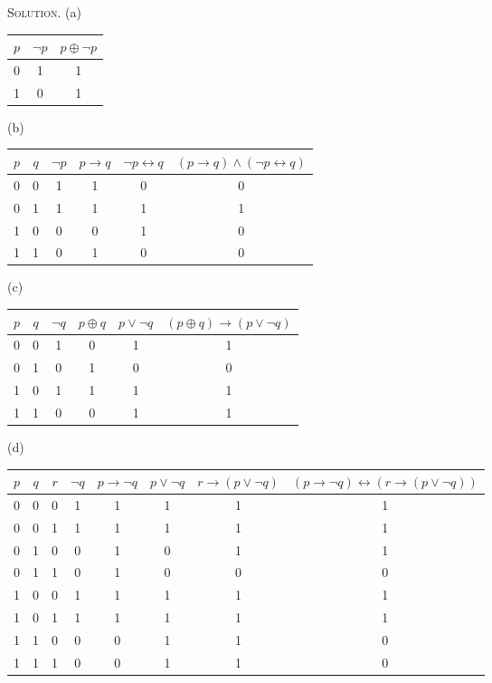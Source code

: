 \documentclass[12pt, a4paper, oneside]{article}
\newenvironment{solution}{\par\noindent\textsc{Solution. }}{\\\par}
\begin{document}
\begin{solution}
\newline(a)
\begin{table}[!htbp]
\begin{tabular}{|c|c|c|}
\hline
$p$ & $\neg p$ & $p\oplus \neg p$ \\ \hline
0 & 1 & 1 \\ \hline
1 & 0 & 1 \\
\hline
\end{tabular}
\end{table}
\newpage\noindent(b)
\begin{table}[!htbp]
\begin{tabular}{|c|c|c|c|c|c|}
\hline
$p$ & $q$ & $\neg p$ & $p \rightarrow q$ & $\neg p \leftrightarrow q$ & $\left( p \rightarrow q \right) \wedge \left( \neg p \leftrightarrow q \right)$\\ \hline
0 & 0 & 1 & 1 & 0 & 0 \\ \hline
0 & 1 & 1 & 1 & 1 & 1 \\ \hline
1 & 0 & 0 & 0 & 1 & 0 \\ \hline
1 & 1 & 0 & 1 & 0 & 0 \\
\hline
\end{tabular}
\end{table}
\newline(c)
\begin{table}[!htbp]
\begin{tabular}{|c|c|c|c|c|c|}
\hline
$p$ & $q$ & $\neg q$ & $p \oplus q$ & $p \vee \neg q$ & $\left( p \oplus q \right) \rightarrow \left( p \vee \neg q \right)$ \\ 
\hline
0 & 0 & 1 & 0 & 1 & 1 \\ \hline
0 & 1 & 0 & 1 & 0 & 0 \\ \hline
1 & 0 & 1 & 1 & 1 & 1 \\ \hline
1 & 1 & 0 & 0 & 1 & 1 \\
\hline
\end{tabular}
\end{table}
\newline(d)
\begin{table}[!htbp]
\begin{tabular}{|c|c|c|c|c|c|c|c|}
\hline
$p$ & $q$ & $r$ & $\neg q$ & $p \rightarrow \neg q$ & $p \vee \neg q$ & $r \rightarrow \left( p \vee \neg q \right)$
& $\left( p \rightarrow \neg q \right) \leftrightarrow \left( r \rightarrow \left( p \vee \neg q \right) \right)$\\ \hline
0 & 0 & 0 & 1 & 1 & 1 & 1 & 1 \\ \hline
0 & 0 & 1 & 1 & 1 & 1 & 1 & 1 \\ \hline
0 & 1 & 0 & 0 & 1 & 0 & 1 & 1 \\ \hline
0 & 1 & 1 & 0 & 1 & 0 & 0 & 0 \\ \hline
1 & 0 & 0 & 1 & 1 & 1 & 1 & 1 \\ \hline
1 & 0 & 1 & 1 & 1 & 1 & 1 & 1 \\ \hline
1 & 1 & 0 & 0 & 0 & 1 & 1 & 0 \\ \hline
1 & 1 & 1 & 0 & 0 & 1 & 1 & 0 \\
\hline
\end{tabular}
\end{table}
\end{solution}
\newpage
\end{document}
